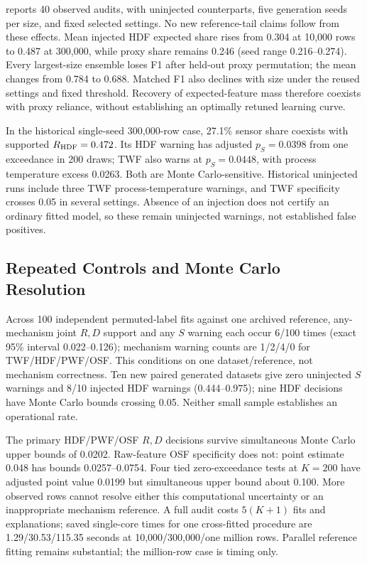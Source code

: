 \documentclass[conference]{IEEEtran}
\begin{document}
 reports 40 observed audits, with uninjected counterparts, five generation seeds per size, and fixed selected settings. No new reference-tail claims follow from these effects. Mean injected HDF expected share rises from 0.304 at 10{,}000 rows to 0.487 at 300{,}000, while proxy share remains 0.246 (seed range 0.216--0.274). Every largest-size ensemble loses F1 after held-out proxy permutation; the mean changes from 0.784 to 0.688. Matched F1 also declines with size under the reused settings and fixed threshold. Recovery of expected-feature mass therefore coexists with proxy reliance, without establishing an optimally retuned learning curve.

In the historical single-seed 300{,}000-row case, 27.1\% sensor share coexists with supported $R_{\rm HDF}=0.472$. Its HDF warning has adjusted $p_S=0.0398$ from one exceedance in 200 draws; TWF also warns at $p_S=0.0448$, with process temperature excess 0.0263. Both are Monte Carlo-sensitive. Historical uninjected runs include three TWF process-temperature warnings, and TWF specificity crosses 0.05 in several settings. Absence of an injection does not certify an ordinary fitted model, so these remain uninjected warnings, not established false positives.

\subsection{Repeated Controls and Monte Carlo Resolution}
Across 100 independent permuted-label fits against one archived reference, any-mechanism joint $R,D$ support and any $S$ warning each occur 6/100 times (exact 95\% interval 0.022--0.126); mechanism warning counts are 1/2/4/0 for TWF/HDF/PWF/OSF. This conditions on one dataset/reference, not mechanism correctness. Ten new paired generated datasets give zero uninjected $S$ warnings and 8/10 injected HDF warnings (0.444--0.975); nine HDF decisions have Monte Carlo bounds crossing 0.05. Neither small sample establishes an operational rate.

The primary HDF/PWF/OSF $R,D$ decisions survive simultaneous Monte Carlo upper bounds of 0.0202. Raw-feature OSF specificity does not: point estimate 0.048 has bounds 0.0257--0.0754. Four tied zero-exceedance tests at $K=200$ have adjusted point value 0.0199 but simultaneous upper bound about 0.100. More observed rows cannot resolve either this computational uncertainty or an inappropriate mechanism reference. A full audit costs $5(K+1)$ fits and explanations; saved single-core times for one cross-fitted procedure are 1.29/30.53/115.35 seconds at 10{,}000/300{,}000/one million rows. Parallel reference fitting remains substantial; the million-row case is timing only.
\end{document}
